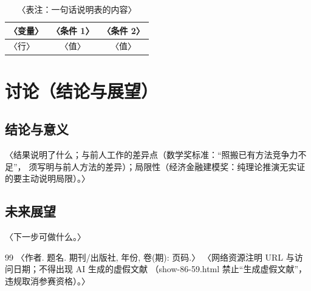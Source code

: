 \documentclass[12pt, a4paper]{article}
\begin{document}
\begin{table}[htbp]
  \centering
  \caption{〈表注：一句话说明表的内容〉}
  \label{tab:example}
  \begin{tabular}{lcc}
    \toprule
    〈变量〉 & 〈条件 1〉 & 〈条件 2〉 \\
    \midrule
    〈行〉 & 〈值〉 & 〈值〉 \\
    \bottomrule
  \end{tabular}
\end{table}

\section{讨论（结论与展望）}
\subsection{结论与意义}
〈结果说明了什么；与前人工作的差异点（数学奖标准：“照搬已有方法竞争力不足”，
须写明与前人方法的差异）；局限性（经济金融建模奖：纯理论推演无实证的要主动说明局限）。〉
\subsection{未来展望}
〈下一步可做什么。〉

\clearpage
\begin{thebibliography}{99}
 〈作者. 题名. 期刊/出版社, 年份, 卷(期): 页码.〉
 〈网络资源注明 URL 与访问日期；不得出现 AI 生成的虚假文献
（show-86-59.html 禁止“生成虚假文献”，违规取消参赛资格）。〉
\end{thebibliography}

\clearpage
\end{document}
